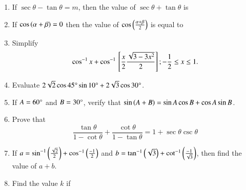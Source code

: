 \begin{enumerate}[label=\thesubsection.\arabic*,ref=\thesubsection.\theenumi,itemsep=1pt]
	 \hfill{}
\item If $\sec\theta - \tan\theta = m$, then the value of $\sec\theta + \tan\theta$ is
 \hfill{}\item If $\cos\left(\alpha + \beta\right) = 0$ then the value of $\cos\left(\frac{\alpha + \beta}{2}\right)$ is equal to
\hfill{}
\item Simplify $$\cos^{-1}x + \cos^{-1}{}\left[\frac{x}{2}{\frac{\sqrt{3-3x^2}}{2}}\right];-\frac{1}{2} \leq x \leq 1.$$
\hfill{}\item Evaluate $2\sqrt{2} \cos 45\degree \sin 10\degree + 2\sqrt{3} \cos 30\degree$.
\hfill{}\item If  $A = 60\degree$ and  $B = 30\degree$, verify that  $\sin\left(A + B\right) = \sin A \cos B + \cos A \sin B$.
\hfill{}\item Prove that  $$\frac{\tan{\theta}}{1 - \cot{\theta}} + \frac{\cot{\theta}}{1 - \tan{\theta}} = 1 + \sec
{\theta}\csc{\theta}$$
\hfill{}
\item If $ a = \sin^{-1}\left(\frac{\sqrt{2}}{2}\right) + \cos^{-1}\left(\frac{-1}{2}\right) $ and $ b = \tan^{-1}\left(\sqrt{3}\right) + \cot^{-1}\left(\frac{-1}{\sqrt{3}}\right) $, then find the value of $a + b$.
\hfill{}\item Find the value $k$ if 
 

\end{enumerate}
